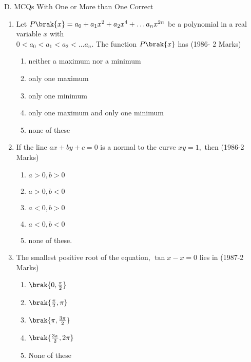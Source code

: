 \documentclass[journal,12pt,twocolumn]{IEEEtran}
\theoremstyle{remark}
\begin{document}
    D. MCQs With One or More than One Correct
     \begin{enumerate}
       \item 
	     Let $P\brak{x} = a_0+ a_1x^2+a_2x^4+\dots a_nx^{2n}$ be a polynomial in a real variable $x$ with \\
		 $0<a_0<a_1<a_2<\dots a_n. $ The function $P\brak{x}$ has 
	 \hfill(1986- 2 Marks)
      \begin{enumerate}

         \item neither a maximum nor a minimum
 
         \item only one maximum

         \item only one minimum

         \item only one maximum and only one minimum
   
         \item none of these\\

      \end{enumerate} 

      \item
       If the line $ax+by+c = 0$ is a normal to the curve $xy=1,$ then 
	 \hfill(1986-2 Marks)
        \begin{enumerate}
         \item $a>0,b>0$ 
         \item $a>0,b<0$ 
         \item $a<0,b>0$
         \item $a<0,b<0$
         \item none of these.
       \end{enumerate}

      \item 
      The smallest positive root of the equation, $\tan x-x=0$ lies in 
	\hfill(1987-2 Marks)
      \begin{enumerate}
       \item $\brak{0,\frac{\pi}{2}}$
       \item $\brak{\frac{\pi}{2},\pi}$
       \item $\brak{\pi,\frac{3\pi}{2}}$
       \item $\brak{\frac{3\pi}{2},2\pi}$
       \item None of these\\
      \end{enumerate}


\end{enumerate}
\end{document}
